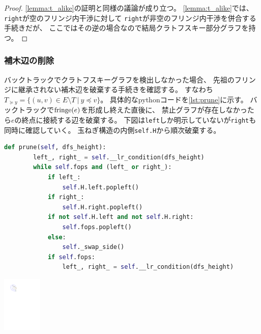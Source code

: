 \begin{proof}
\cref{lemma:t_alike}の証明と同様の議論が成り立つ。
\cref{lemma:t_alike}では、
{\tt right}が空のフリンジ内干渉に対して
{\tt right}が非空のフリンジ内干渉を併合する手続きだが、
ここではその逆の場合なので結局クラトフスキー部分グラフを持つ。
%
%
\end{proof}





\subsubsection{補木辺の削除}
バックトラックでクラトフスキーグラフを検出しなかった場合、
先祖のフリンジに継承されない補木辺を破棄する手続きを確認する。
すなわち$T_{\succeq y}=\{(u, v) \in E \setminus T ~|~ y \preceq v\}$。
具体的なpythonコードを\lstrefname\ref{lst:prune}に示す。
バックトラックで$\operatorname{fringe}(e)$を形成し終えた直後に、
禁止グラフが存在しなかったら$e$の終点に接続する辺を破棄する。
下図は{\tt left}しか明示していないが{\tt right}も同時に確認していく。
玉ねぎ構造の内側{\tt self.H}から順次破棄する。

\begin{paracol}{2}
\begin{lstlisting}[language=Python, caption=prune,
                   label=lst:prune]
    def prune(self, dfs_height):
        left_, right_ = self.__lr_condition(dfs_height)
        while self.fops and (left_ or right_):
            if left_:
                self.H.left.popleft()
            if right_:
                self.H.right.popleft()
            if not self.H.left and not self.H.right:
                self.fops.popleft()
            else:
                self._swap_side()
            if self.fops:
                left_, right_ = self.__lr_condition(dfs_height)
\end{lstlisting}
\switchcolumn
\vspace{2.5\intextsep}
\centering
\includegraphics[width=0.14\textwidth]{figures/prune_in_fringe.pdf}
\end{paracol}

